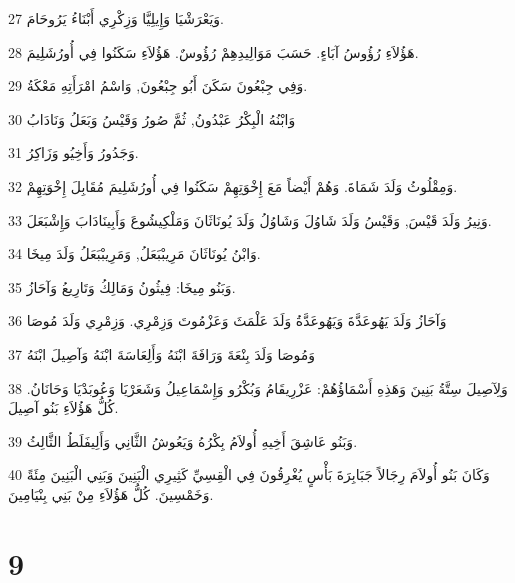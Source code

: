 \par 27 وَيَعْرَشْيَا وَإِيلِيَّا وَزِكْرِي أَبْنَاءُ يَرُوحَامَ.
\par 28 هَؤُلاَءِ رُؤُوسُ آبَاءٍ. حَسَبَ مَوَالِيدِهِمْ رُؤُوسٌ. هَؤُلاَءِ سَكَنُوا فِي أُورُشَلِيمَ.
\par 29 وَفِي جِبْعُونَ سَكَنَ أَبُو جِبْعُونَ, وَاسْمُ امْرَأَتِهِ مَعْكَةُ.
\par 30 وَابْنُهُ الْبِكْرُ عَبْدُونُ, ثُمَّ صُورُ وَقَيْسُ وَبَعَلُ وَنَادَابُ
\par 31 وَجَدُورُ وَأَخِيُو وَزَاكِرُ.
\par 32 وَمِقْلُوثُ وَلَدَ شَمَاةَ. وَهُمْ أَيْضاً مَعَ إِخْوَتِهِمْ سَكَنُوا فِي أُورُشَلِيمَ مُقَابِلَ إِخْوَتِهِمْ.
\par 33 وَنِيرُ وَلَدَ قَيْسَ, وَقَيْسُ وَلَدَ شَاوُلَ وَشَاوُلُ وَلَدَ يُونَاثَانَ وَمَلْكِيشُوعَ وَأَبِينَادَابَ وَإِشْبَعَلَ.
\par 34 وَابْنُ يُونَاثَانَ مَرِيبْبَعَلُ, وَمَرِيبْبَعَلُ وَلَدَ مِيخَا.
\par 35 وَبَنُو مِيخَا: فِيثُونُ وَمَالِكُ وَتَارِيعُ وَآحَازُ.
\par 36 وَآحَازُ وَلَدَ يَهُوعَدَّةَ وَيَهُوعَدَّةُ وَلَدَ عَلْمَثَ وَعَزْمُوتَ وَزِمْرِي. وَزِمْرِي وَلَدَ مُوصَا
\par 37 وَمُوصَا وَلَدَ بِنْعَةَ وَرَافَةَ ابْنَهُ وَأَلِعَاسَةَ ابْنَهُ وَآصِيلَ ابْنَهُ
\par 38 وَلِآصِيلَ سِتَّةُ بَنِينَ وَهَذِهِ أَسْمَاؤُهُمْ: عَزْرِيقَامُ وَبُكْرُو وَإِسْمَاعِيلُ وَشَعَرْيَا وَعُوبَدْيَا وَحَانَانُ. كُلُّ هَؤُلاَءِ بَنُو آصِيلَ.
\par 39 وَبَنُو عَاشِقَ أَخِيهِ أُولاَمُ بِكْرُهُ وَيَعُوشُ الثَّانِي وَأَلِيفَلَطُ الثَّالِثُ.
\par 40 وَكَانَ بَنُو أُولاَمَ رِجَالاً جَبَابِرَةَ بَأْسٍ يُغْرِقُونَ فِي الْقِسِيِّ كَثِيرِي الْبَنِينَ وَبَنِي الْبَنِينَ مِئَةً وَخَمْسِينَ. كُلُّ هَؤُلاَءِ مِنْ بَنِي بِنْيَامِينَ.

\chapter{9}

